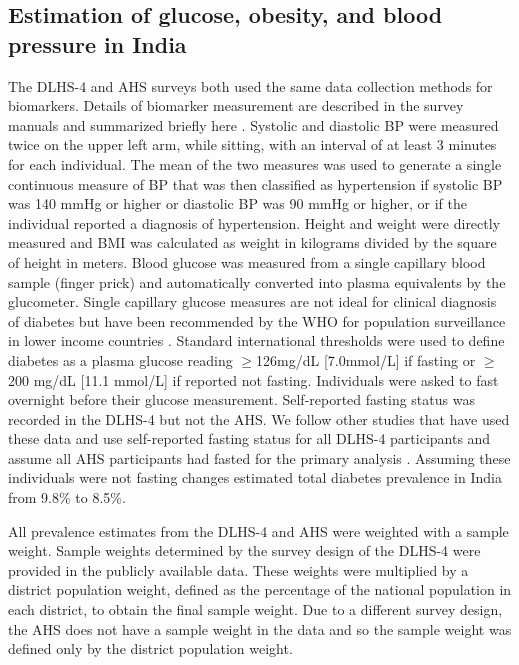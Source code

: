 \documentclass[10pt,letterpaper]{article}
\numberwithin{equation}{section}
\begin{document}
\subsection{Estimation of glucose, obesity, and blood pressure in India}
\label{sec:glucose}
The DLHS-4 and AHS surveys both used the same data collection methods for biomarkers. Details of biomarker measurement are described in the survey manuals and summarized briefly here \cite{noauthor_annual_2014}. Systolic and diastolic BP were measured twice on the upper left arm, while sitting, with an interval of at least 3 minutes for each individual. The mean of the two measures was used to generate a single continuous measure of BP that was then classified as hypertension if systolic BP was 140 mmHg or higher or diastolic BP was 90 mmHg or higher, or if the individual reported a diagnosis of hypertension. Height and weight were directly measured and BMI was calculated as weight in kilograms divided by the square of height in meters. Blood glucose was measured from a single capillary blood sample (finger prick) and automatically converted into plasma equivalents by the glucometer. Single capillary glucose measures are not ideal for clinical diagnosis of diabetes but have been recommended by the WHO for population surveillance in lower income countries \cite{diabetesWHO}. Standard international thresholds were used to define diabetes as a plasma glucose reading $\geq$126mg/dL [\num{7.0}mmol/L] if fasting or $\geq$200 mg/dL [\num{11.1} mmol/L] if reported not fasting. Individuals were asked to fast overnight before their glucose measurement. Self-reported fasting status was recorded in the DLHS-4 but not the AHS. We follow other studies that have used these data and use self-reported fasting status for all DLHS-4 participants and assume all AHS participants had fasted for the primary analysis \cite{geldsetzer2018,bischops2019}.  Assuming these individuals were not fasting changes estimated total diabetes prevalence in India from \num{9.8}\% to \num{8.5}\%.

All prevalence estimates from the DLHS-4 and AHS were weighted with a sample weight. Sample weights determined by the survey design of the DLHS-4 were provided in the publicly available data. These weights were multiplied by a district population weight, defined as the percentage of the national population in each district, to obtain the final sample weight. Due to a different survey design, the AHS does not have a sample weight in the data and so the sample weight was defined only by the district population weight.
\end{document}
